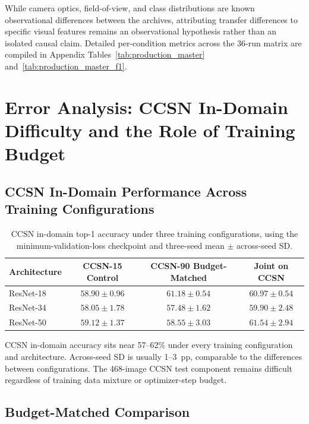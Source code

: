\documentclass[11pt,a4paper]{article}
\begin{document}
While camera optics, field-of-view, and class distributions are known observational differences between the archives, attributing transfer differences to specific visual features remains an observational hypothesis rather than an isolated causal claim. Detailed per-condition metrics across the 36-run matrix are compiled in Appendix Tables~\ref{tab:production_master} and~\ref{tab:production_master_f1}.

\FloatBarrier
\section{Error Analysis: CCSN In-Domain Difficulty and the Role of Training Budget}
\label{sec:failure_modes}

\subsection{CCSN In-Domain Performance Across Training Configurations}

\begin{table}[!htbp]
\centering
\begin{tabular}{lccc}
\toprule
\textbf{Architecture} & \textbf{CCSN-15 Control} & \textbf{CCSN-90 Budget-Matched} & \textbf{Joint on CCSN} \\
\midrule
ResNet-18 & $58.90 \pm 0.96$ & $61.18 \pm 0.54$ & $60.97 \pm 0.54$ \\
ResNet-34 & $58.05 \pm 1.78$ & $57.48 \pm 1.62$ & $59.90 \pm 2.48$ \\
ResNet-50 & $59.12 \pm 1.37$ & $58.55 \pm 3.03$ & $61.54 \pm 2.94$ \\
\bottomrule
\end{tabular}
\caption{CCSN in-domain top-1 accuracy under three training configurations, using the minimum-validation-loss checkpoint and three-seed mean $\pm$ across-seed SD.}
\label{tab:ccsn_configs}
\end{table}

CCSN in-domain accuracy sits near 57--62\% under every training configuration and architecture. Across-seed SD is usually 1--3~pp, comparable to the differences between configurations. The 468-image CCSN test component remains difficult regardless of training data mixture or optimizer-step budget.

\subsection{Budget-Matched Comparison}
\end{document}
